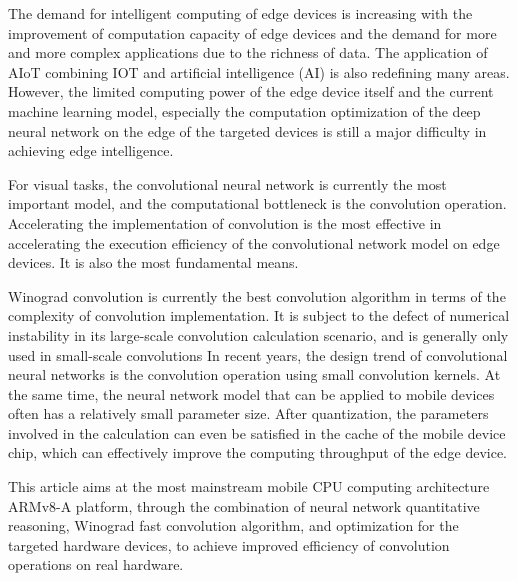 \begin{abstract*}

  The demand for intelligent computing of edge devices is increasing 
  with the improvement of computation capacity of edge devices and 
  the demand for more and more complex applications due to the 
  richness of data. The application of AIoT combining IOT and 
  artificial intelligence (AI) is also redefining many areas. 
  However, the limited computing power of the edge device itself 
  and the current machine learning model, especially the computation 
  optimization of the deep neural network on the edge of the targeted
  devices is still a major difficulty in achieving edge intelligence.

  For visual tasks, the convolutional neural network is currently the 
  most important model, and the computational bottleneck is the 
  convolution operation. Accelerating the implementation of 
  convolution is the most effective in accelerating the execution 
  efficiency of the convolutional network model on edge devices.
  It is also the most fundamental means.

  Winograd convolution is currently the best convolution algorithm 
  in terms of the complexity of convolution implementation. It is 
  subject to the defect of numerical instability in its large-scale 
  convolution calculation scenario, and is generally only used in 
  small-scale convolutions In recent years, the design trend of 
  convolutional neural networks is the convolution operation using 
  small convolution kernels. At the same time, the neural network 
  model that can be applied to mobile devices often has a relatively
  small parameter size. After quantization, the parameters involved 
  in the calculation can even be satisfied in the cache of the 
  mobile device chip, which can effectively improve the computing 
  throughput of the edge device.

  This article aims at the most mainstream mobile CPU computing 
  architecture ARMv8-A platform, through the combination of neural
  network quantitative reasoning, Winograd fast convolution algorithm, 
  and optimization for the targeted hardware devices, to achieve 
  improved efficiency of convolution operations on real hardware.
\end{abstract*}
